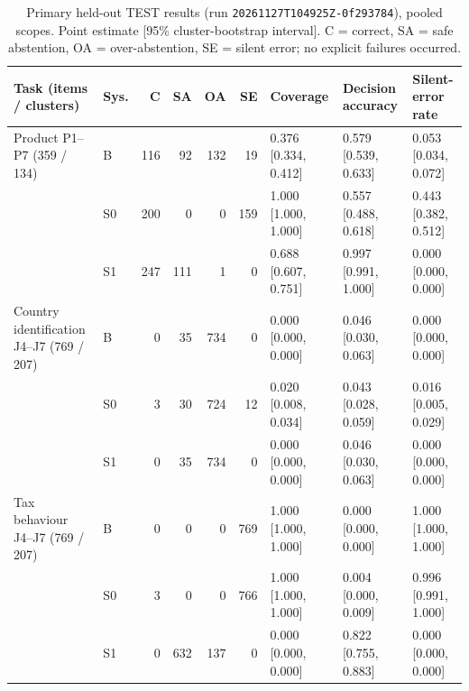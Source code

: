 \begin{table}[t]
\centering
\caption{Primary held-out TEST results (run \texttt{20261127T104925Z-0f293784}), pooled scopes. Point estimate [95\% cluster-bootstrap interval]. C = correct, SA = safe abstention, OA = over-abstention, SE = silent error; no explicit failures occurred.}
\label{tab:primary}
\footnotesize
\begin{tabular}{@{}llrrrrlll@{}}
\toprule
Task (items / clusters) & Sys. & C & SA & OA & SE & Coverage & Decision accuracy & Silent-error rate \\
\midrule
Product P1--P7 (359 / 134) & B & 116 & 92 & 132 & 19 & 0.376 [0.334, 0.412] & 0.579 [0.539, 0.633] & 0.053 [0.034, 0.072] \\
 & S0 & 200 & 0 & 0 & 159 & 1.000 [1.000, 1.000] & 0.557 [0.488, 0.618] & 0.443 [0.382, 0.512] \\
 & S1 & 247 & 111 & 1 & 0 & 0.688 [0.607, 0.751] & 0.997 [0.991, 1.000] & 0.000 [0.000, 0.000] \\
\midrule
Country identification J4--J7 (769 / 207) & B & 0 & 35 & 734 & 0 & 0.000 [0.000, 0.000] & 0.046 [0.030, 0.063] & 0.000 [0.000, 0.000] \\
 & S0 & 3 & 30 & 724 & 12 & 0.020 [0.008, 0.034] & 0.043 [0.028, 0.059] & 0.016 [0.005, 0.029] \\
 & S1 & 0 & 35 & 734 & 0 & 0.000 [0.000, 0.000] & 0.046 [0.030, 0.063] & 0.000 [0.000, 0.000] \\
\midrule
Tax behaviour J4--J7 (769 / 207) & B & 0 & 0 & 0 & 769 & 1.000 [1.000, 1.000] & 0.000 [0.000, 0.000] & 1.000 [1.000, 1.000] \\
 & S0 & 3 & 0 & 0 & 766 & 1.000 [1.000, 1.000] & 0.004 [0.000, 0.009] & 0.996 [0.991, 1.000] \\
 & S1 & 0 & 632 & 137 & 0 & 0.000 [0.000, 0.000] & 0.822 [0.755, 0.883] & 0.000 [0.000, 0.000] \\
\bottomrule
\end{tabular}
\end{table}
